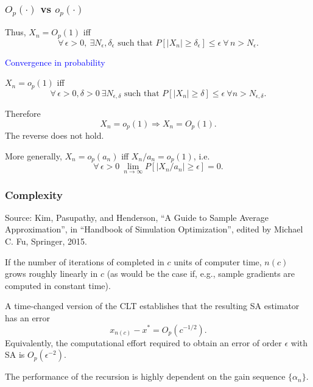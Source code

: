 \documentclass{beamer}
\begin{document}
\begin{frame}
\frametitle{$O_p(\cdot)$ vs $o_p(\cdot)$}

Thus, $X_n = O_p(1)$ iff
$$
\forall\, \epsilon > 0,\ \exists N_{\epsilon}, \delta_{\epsilon} \text{ such that } P[|X_{n} | \geq \delta_{\epsilon }] \leq \epsilon \ \forall\, n > N_{\epsilon}.
$$

\mbox{}

\textcolor{blue}{Convergence in probability}

$X_n = o_p(1)$ iff
$$
\forall\, \epsilon > 0, \delta > 0 \ \exists N_{\epsilon ,\delta } \text{ such that } P[|X_{n}|\geq \delta] \leq \epsilon \ \forall n > N_{\epsilon, \delta}.
$$

\mbox{}

Therefore
$$
X_n = o_p(1) \Rightarrow X_n = O_p(1).
$$
The reverse does not hold.

\mbox{}

More generally, $X_n = o_p(a_n)$ iff $X_n/{a_n} = o_p(1)$, i.e.
$$
\forall\, \epsilon > 0\ \lim_{n \rightarrow \infty} P[ |X_{n}/{a_n}| \geq \epsilon ] = 0.
$$

\end{frame}

\begin{frame}
\frametitle{Complexity}

Source: Kim, Pasupathy, and Henderson, ``A Guide to Sample Average Approximation'', in ``Handbook of Simulation Optimization'', edited by Michael C. Fu, Springer, 2015.

\mbox{}

If the number of iterations of completed in $c$ units of computer time, $n(c)$ grows roughly linearly in $c$
(as would be the case if, e.g., sample gradients are computed in constant time).

\mbox{}

A time-changed version of the CLT establishes that the resulting SA estimator has
an error
$$
x_{n(c)} - x^* = O_p(c^{-1/2}).
$$
Equivalently, the computational effort required to obtain an error of order $\epsilon$ with SA is $O_p(\epsilon^{-2})$.

\mbox{}

The performance of the recursion is highly dependent on the gain sequence $\{ \alpha_n \}$.

\end{frame}
\end{document}

